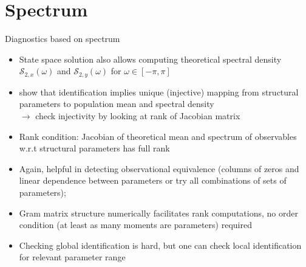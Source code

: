 \section{Spectrum}

\begin{frame}{Diagnostics based on spectrum}

\begin{itemize}
\item State space solution also allows computing theoretical spectral density $\mathcal{S}_{2,x}(\omega)$ and $\mathcal{S}_{2,y}(\omega)$ for $\omega \in [-\pi,\pi]$
\item \textcite{QuTkachenko2012} show that identification implies unique (injective) mapping from structural parameters to population mean and spectral density\\
$\rightarrow$ check injectivity by looking at rank of Jacobian matrix
\item Rank condition: Jacobian of theoretical mean and spectrum of observables w.r.t structural parameters has full rank
\item Again, helpful in detecting observational equivalence (columns of zeros and linear dependence between parameters or try all combinations of sets of parameters);
\item Gram matrix structure numerically facilitates rank computations, no order condition (at least as many moments are parameters) required 
\item Checking global identification is hard, but one can check local identification for relevant parameter range
\end{itemize}
\end{frame}

%

